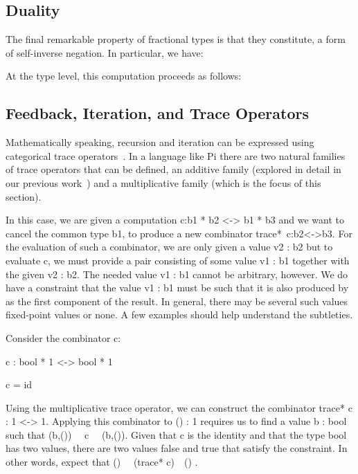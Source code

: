 \documentclass{llncs}
\begin{document}
\subsection{Duality}

The final remarkable property of fractional types is that they
constitute, a form of self-inverse negation. In particular, we have:


\noindent At the type level, this computation proceeds as follows:


\subsection{Feedback, Iteration, and Trace Operators}

Mathematically speaking, recursion and iteration can be expressed using
categorical trace
operators~\cite{joyal1996traced,Hasegawa:1997:RCS:645893.671607}.  In a
language like {{Pi}} there are two natural families of trace operators
that can be defined, an additive family (explored in detail in our previous
work~\cite{rc2011}) and a multiplicative family (which is the focus of this
section).

In this case, we are given a computation {{c:b1 * b2 <-> b1 * b3}} and we
want to cancel the common type {{b1}}, to produce a new combinator
{{trace*~c:b2<->b3}}. For the evaluation of such a combinator, we are only
given a value {{v2 : b2}} but to evaluate {{c}}, we must provide a pair
consisting of some value {{v1 : b1}} together with the given {{v2 : b2}}. The
needed value {{v1 : b1}} cannot be arbitrary, however. We do have a
constraint that the value {{v1 : b1}} must be such that it is also produced
by as the first component of the result. In general, there may be several
such values fixed-point values or none.  A few examples should help
understand the subtleties.

\begin{example}
Consider the combinator {{c}}:

{{c : bool * 1 <-> bool * 1}} 

{{c = id}}

\noindent Using the multiplicative trace operator, we can construct the
combinator {{trace* c : 1 <-> 1}}. Applying this combinator to 
{{() : 1}} requires us to find a value {{b : bool}} such that 
{{(b,()) ~~c~~ (b,())}}. Given that {{c}} is the identity and that the type {{bool}} 
has two values, there are two values {{false}} and {{true}} that satisfy the 
constraint. In other words, expect that {{() ~~(trace* c)~~() }}.
\end{example}
\end{document}
